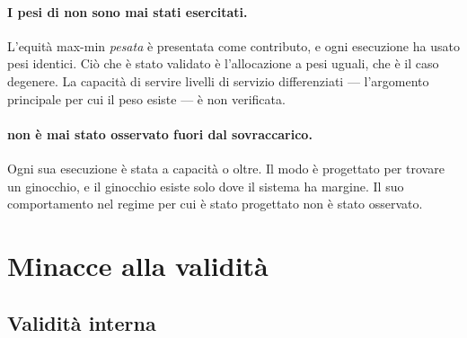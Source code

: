 \paragraph{I pesi di  non sono mai stati esercitati.} L'equit\`a
max-min \emph{pesata} \`e presentata come contributo, e ogni esecuzione ha usato
pesi identici. Ci\`o che \`e stato validato \`e l'allocazione a pesi uguali, che
\`e il caso degenere. La capacit\`a di servire livelli di servizio differenziati
--- l'argomento principale per cui il peso esiste --- \`e non verificata.

\paragraph{ non \`e mai stato osservato fuori dal sovraccarico.}
Ogni sua esecuzione \`e stata a capacit\`a o oltre. Il modo \`e progettato per
trovare un ginocchio, e il ginocchio esiste solo dove il sistema ha margine.
Il suo comportamento nel regime per cui \`e stato progettato non \`e stato
osservato.

\section{Minacce alla validit\`a}

\subsection{Validit\`a interna}

